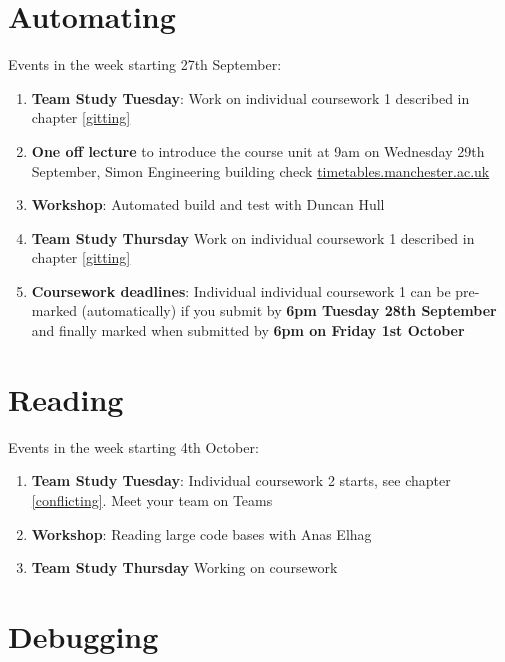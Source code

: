 \documentclass[
]{book}
\providecommand{\tightlist}{%
  \setlength{\itemsep}{0pt}\setlength{\parskip}{0pt}}
\begin{document}
\hypertarget{week1}{%
\section{Automating}\label{week1}}

Events in the week starting 27th September:

\begin{enumerate}
\def\labelenumi{\arabic{enumi}.}
\tightlist
\item
  \textbf{Team Study Tuesday}: Work on individual coursework 1 described in chapter \ref{gitting}
\item
  \textbf{One off lecture} to introduce the course unit at 9am on Wednesday 29th September, Simon Engineering building check \href{https://timetables.manchester.ac.uk/}{timetables.manchester.ac.uk}
\item
  \textbf{Workshop}: Automated build and test with Duncan Hull
\item
  \textbf{Team Study Thursday} Work on individual coursework 1 described in chapter \ref{gitting}
\item
  \textbf{Coursework deadlines}: Individual individual coursework 1 can be pre-marked (automatically) if you submit by \textbf{6pm Tuesday 28th September} and finally marked when submitted by \textbf{6pm on Friday 1st October}
\end{enumerate}

\hypertarget{week2}{%
\section{Reading}\label{week2}}

Events in the week starting 4th October:

\begin{enumerate}
\def\labelenumi{\arabic{enumi}.}
\tightlist
\item
  \textbf{Team Study Tuesday}: Individual coursework 2 starts, see chapter \ref{conflicting}. Meet your team on Teams
\item
  \textbf{Workshop}: Reading large code bases with Anas Elhag
\item
  \textbf{Team Study Thursday} Working on coursework
\end{enumerate}

\hypertarget{week3}{%
\section{Debugging}\label{week3}}
\end{document}
